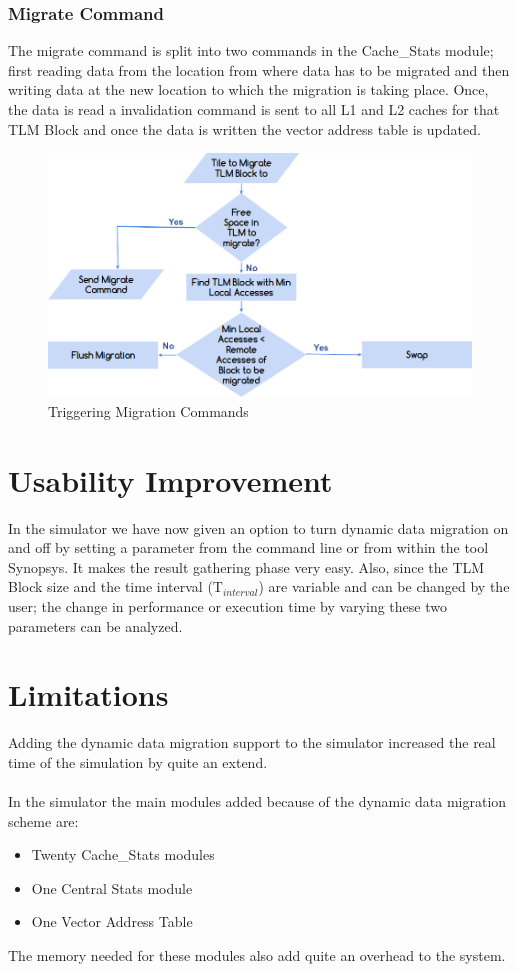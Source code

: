 \documentclass{listhesis}
\begin{document}
\subsubsection{Migrate Command}
The migrate command is split into two commands in the Cache{\_}Stats module; first reading data from the location from where data has to be migrated and then writing data at the new location to which the migration is taking place. Once, the data is read a invalidation command is sent to all L1 and L2 caches for that TLM Block and once the data is written the vector address table is updated. \\
\begin{figure}
  \includegraphics[width=\linewidth]{tlmstats.png}
  \centering
  \caption{Triggering Migration Commands}
  \label{fig:tlm_stats flowchart}
\end{figure}
\section{Usability Improvement}
In the simulator we have now given an option to turn dynamic data migration on and off by setting a parameter from the command line or from within the tool Synopsys. It makes the result gathering phase very easy. Also, since the TLM Block size and the time interval (T$_{interval}$) are variable and can be changed by the user; the change in performance or execution time by varying these two parameters can be analyzed.
\section{Limitations}
Adding the dynamic data migration support to the simulator increased the real time of the simulation by quite an extend. \\
\\
In the simulator the main modules added because of the dynamic data migration scheme are:
\begin{itemize}
  \item Twenty Cache{\_}Stats modules
  \item One Central Stats module 
  \item One Vector Address Table
\end{itemize}
The memory needed for these modules also add quite an overhead to the system. 
\end{document}
